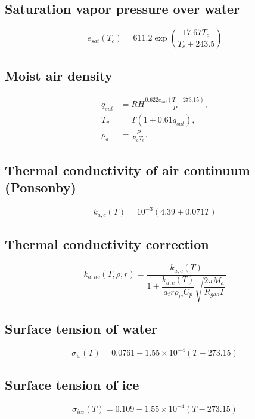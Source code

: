 \documentclass{article}
\begin{document}
\subsection*{Saturation vapor pressure over water}
\begin{equation}
e_{sat}(T_c)=611.2\exp\left(\frac{17.67T_c}{T_c+243.5}\right)
\end{equation}

\subsection*{Moist air density}
\begin{align}
q_{sat}&=RH\frac{0.622 e_{sat}(T-273.15)}{P},\\
T_v&=T(1+0.61 q_{sat}),\\
\rho_a&=\frac{P}{R_d T_v}.
\end{align}

\subsection*{Thermal conductivity of air continuum (Ponsonby)}
\begin{equation}
 k_{a,c}(T)=10^{-3}(4.39+0.071T)
\end{equation}

\subsection*{Thermal conductivity correction}
\begin{equation}
 k_{a,nc}(T,\rho,r)=\frac{k_{a,c}(T)}{1+\dfrac{k_{a,c}(T)}{a_t r \rho_w C_p}\sqrt{\dfrac{2\pi M_a}{R_{gas}T}}}
\end{equation}

\subsection*{Surface tension of water}
\begin{equation}
\sigma_w(T)=0.0761-1.55\times10^{-4}(T-273.15)
\end{equation}

\subsection*{Surface tension of ice}
\begin{equation}
\sigma_{ice}(T)=0.109-1.55\times10^{-4}(T-273.15)
\end{equation}
\end{document}

